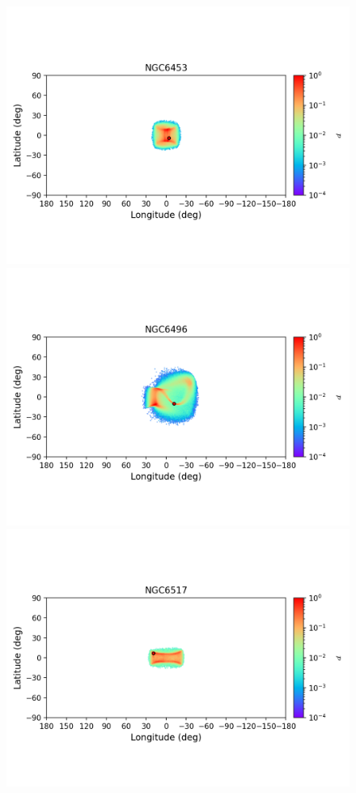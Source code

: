         \begin{figure}
        \includegraphics[clip=true, trim = 0mm 20mm 0mm 10mm, width=1\columnwidth]{images/error_plots_NGC6453.png}
        \includegraphics[clip=true, trim = 0mm 20mm 0mm 10mm, width=1\columnwidth]{images/error_plots_NGC6496.png}
        \includegraphics[clip=true, trim = 0mm 20mm 0mm 10mm, width=1\columnwidth]{images/error_plots_NGC6517.png}

\end{figure}
